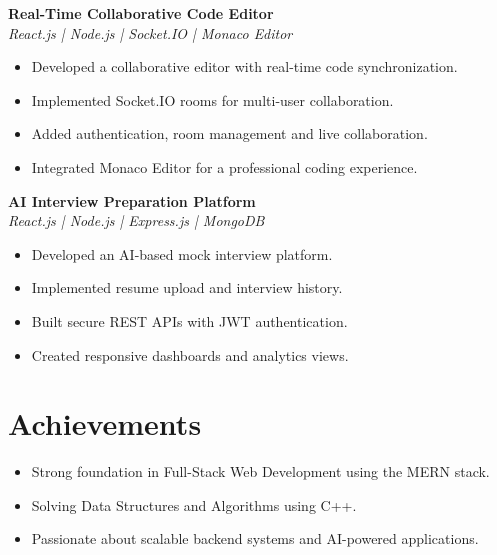 \documentclass[10pt,a4paper]{article}
\begin{document}
\textbf{Real-Time Collaborative Code Editor}\\
\textit{React.js | Node.js | Socket.IO | Monaco Editor}
\begin{itemize}[leftmargin=*]
\item Developed a collaborative editor with real-time code synchronization.
\item Implemented Socket.IO rooms for multi-user collaboration.
\item Added authentication, room management and live collaboration.
\item Integrated Monaco Editor for a professional coding experience.
\end{itemize}

\textbf{AI Interview Preparation Platform}\\
\textit{React.js | Node.js | Express.js | MongoDB}
\begin{itemize}[leftmargin=*]
\item Developed an AI-based mock interview platform.
\item Implemented resume upload and interview history.
\item Built secure REST APIs with JWT authentication.
\item Created responsive dashboards and analytics views.
\end{itemize}

\section*{Achievements}
\begin{itemize}[leftmargin=*]
\item Strong foundation in Full-Stack Web Development using the MERN stack.
\item Solving Data Structures and Algorithms using C++.
\item Passionate about scalable backend systems and AI-powered applications.
\end{itemize}
\end{document}
